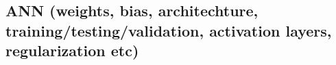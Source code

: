 \subsection{ANN (weights, bias, architechture, training/testing/validation, activation layers, regularization etc)}